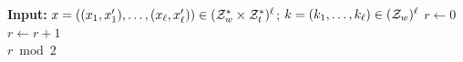 \begin{algorithm}
  \caption{\label{alg:ealpn}The {\sf EALPN} wPRF \\
    Parameters:  integers $N$, $t$, $\ell$,  $w = \lceil \frac{5N}{t} \rceil$}
  \begin{algorithmic}
  \State \textbf{Input:}  $x = ((x_1,x'_1), \dots, (x_\ell,x'_\ell)) \in ( \mathcal{Z}^*_{w}\times \mathcal{Z}^*_{t})^\ell$; $k = (k_1, \dots, k_{\ell}) \in (\mathcal{Z}_{w})^{\ell}$
    \State $r \gets 0$
        \State $r \gets r + 1$
    \EndIf
\EndFor\\
\Return $r \bmod 2$
 \end{algorithmic}
\end{algorithm}



